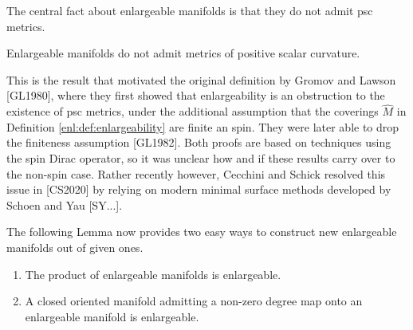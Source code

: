 

The central fact about enlargeable manifolds is that they do not admit psc metrics.

\begin{theorem}[GL1980, GL1982, CS2020]
    \label{enl:thm:enl_mnf_do_not_admit_psc}
    Enlargeable manifolds do not admit metrics of positive scalar curvature.
\end{theorem}

This is the result that motivated the original definition by Gromov and Lawson [GL1980], where they first showed that enlargeability is an obstruction to the existence of psc metrics, under the additional assumption that the coverings $\hat{M}$ in Definition \ref{enl:def:enlargeability} are finite an spin. They were later able to drop the finiteness assumption [GL1982]. Both proofs are based on techniques using the spin Dirac operator, so it was unclear how and if these results carry over to the non-spin case. Rather recently however, Cecchini and Schick resolved this issue in [CS2020] by relying on modern minimal surface methods developed by Schoen and Yau [SY...].

The following Lemma now provides two easy ways to construct new enlargeable manifolds out of given ones. 

\begin{lemma}
    \label{enl:lem:constructing_enlargeable_mnf}
    \begin{enumerate}[label=(\roman*)]
        \item The product of enlargeable manifolds is enlargeable. \label{enl:eq:lem_for_constructing_enlargeable_mnf_1}
        \item A closed oriented manifold admitting a non-zero degree map onto an enlargeable manifold is enlargeable. \label{enl:eq:lem_for_constructing_enlargeable_mnf_2}
    \end{enumerate}
\end{lemma}

